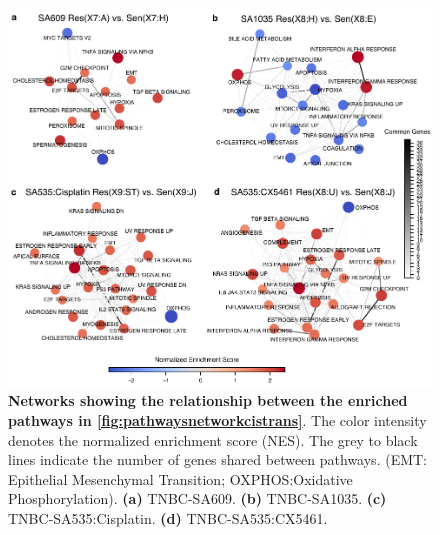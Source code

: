 \begin{figure}
\centering
  \includegraphics[width=\textwidth]{Figures/chap5/fig14_networks.pdf}
\caption[Gene pathway relationships of PDX timeseries]
	{\small
	\textbf{Networks showing the relationship between the enriched pathways in \textbf{\autoref{fig:pathwaysnetworkcistrans}}}. The color intensity denotes the normalized enrichment score (NES). The grey to black lines indicate the number of genes shared between pathways. (EMT: Epithelial Mesenchymal Transition;  OXPHOS:Oxidative Phosphorylation). \textbf{(a)} TNBC-SA609. \textbf{(b)} TNBC-SA1035.  \textbf{(c)} TNBC-SA535:Cisplatin. \textbf{(d)} TNBC-SA535:CX5461.
	}
	\label{fig:networks}
\end{figure}




